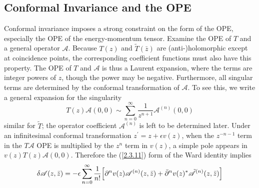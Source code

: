 \subsection*{Conformal Invariance and the OPE}

Conformal invariance imposes a strong constraint on the form of the OPE, especially the OPE of the energy-momentum tensor. Examine the OPE of $T$ and a general operator $\mathscr{A}$.    
Because $T(z)$ and $\tilde{T}(\bar{z})$ are (anti-)holomorphic except at coincidence points, the corresponding coefficient functions must also have this property. The OPE of $T$ and $\mathscr{A}$ is thus a Laurent expansion, where the terms are integer powers of $z$, though the power may be negative. Furthermore, all singular terms are determined by the conformal transformation of $\mathscr{A}$. To see this, we write a general expansion for the singularity    
\begin{equation}\label{2.4.11}
	T(z) \mathscr{A}(0,0) \sim \sum_{n=0}^{\infty} \frac{1}{z^{n+1}} \mathscr{A}^{(n)}(0,0)
\end{equation}
similar for $\tilde{T}$; the operator coefficient $\mathscr{A}^{(n)}$ is left to be determined later.    
Under an infinitesimal conformal transformation $z^{\prime}=z+\epsilon v(z)$, when the $z^{-n-1}$ term in the $T \mathscr{A}$ OPE is multiplied by the $z^n$ term in $v(z)$, a simple pole appears in $v(z) T(z) \mathscr{A}(0,0)$.    
Therefore the (\ref{2.3.11}) form of the Ward identity implies    
\begin{equation}\label{2.4.12}
	\delta \mathscr{A}(z, \bar{z})=-\epsilon \sum_{n=0}^{\infty} \frac{1}{n !}\Bigl[\partial^{n} v(z) \mathscr{A}^{(n)}(z, \bar{z})+\bar{\partial}^{n} v(z)^{*} \tilde{\mathscr{A}}^{(n)}(z, \bar{z})\Bigr]
\end{equation}
